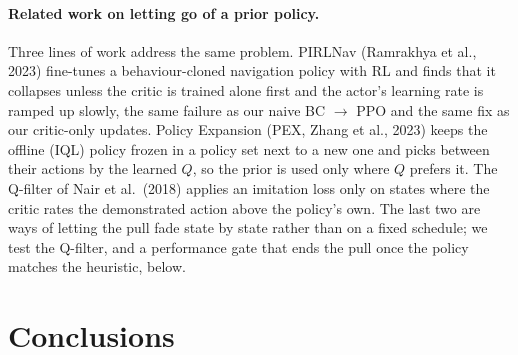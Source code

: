 \documentclass[11pt,a4paper]{article}
\begin{document}
\paragraph{Related work on letting go of a prior policy.} Three lines of work address the same problem.
PIRLNav (Ramrakhya et al., 2023) fine-tunes a behaviour-cloned navigation policy with RL and finds that it collapses
unless the critic is trained alone first and the actor's learning rate is ramped up slowly, the same failure as our
naive BC $\to$ PPO and the same fix as our critic-only updates. Policy Expansion (PEX, Zhang et al., 2023) keeps the
offline (IQL) policy frozen in a policy set next to a new one and picks between their actions by the learned $Q$,
so the prior is used only where $Q$ prefers it. The Q-filter of Nair et al.\ (2018) applies an imitation loss only on
states where the critic rates the demonstrated action above the policy's own. The last two are ways of letting the
pull fade state by state rather than on a fixed schedule; we test the Q-filter, and a performance gate that ends the
pull once the policy matches the heuristic, below.

\section{Conclusions}
\end{document}
